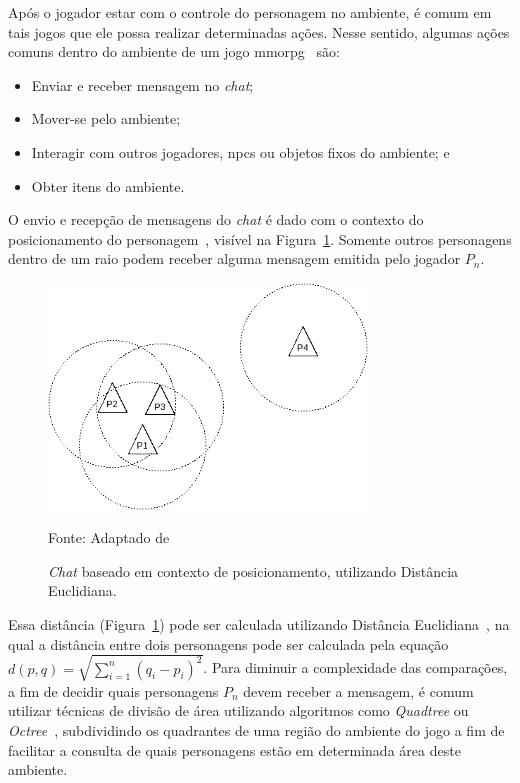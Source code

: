 Após o jogador estar com o controle do personagem no ambiente, é comum em tais jogos que ele possa realizar determinadas ações.
%
Nesse sentido, algumas ações comuns dentro do ambiente de um jogo \ac{mmorpg}~\cite{mmorpg_culture} são:

\begin{itemize}
  \item Enviar e receber mensagem no \textit{chat};
  \item Mover-se pelo ambiente;
  \item Interagir com outros jogadores, \acp{npc} ou objetos fixos do ambiente; e
  \item Obter itens do ambiente.
\end{itemize}



O envio e recepção de mensagens do \textit{chat} é dado com o contexto do posicionamento do personagem~\cite{albion_online_unite}, visível na Figura~\ref{fig:chat}.
%
Somente outros personagens dentro de um raio podem receber alguma mensagem emitida pelo jogador $P_n$.

\begin{figure}[htb!]
\caption{\textit{Chat} baseado em contexto de posicionamento, utilizando Distância Euclidiana.}
\label{fig:chat}
\includegraphics[height=6cm]{img/cap2/chat.png}
\centering

Fonte: Adaptado de ~\cite{albion_online_unite}
\end{figure}

Essa distância (Figura~\ref{fig:chat}) pode ser calculada utilizando Distância Euclidiana~\cite{Deza2009Aug}, na qual a distância entre dois personagens pode ser calculada pela equação $d(p, q) = \sqrt{\sum_{i=1}^{n}(q_i - p_i)^2}$.
%
Para diminuir a complexidade das comparações, a fim de decidir quais personagens $P_n$ devem receber a mensagem, é comum utilizar técnicas de divisão de área utilizando algoritmos como \textit{Quadtree} ou \textit{Octree}~\cite{Lengyel2011Jun}, subdividindo os quadrantes de uma região do ambiente do jogo a fim de facilitar a consulta de quais personagens estão em determinada área deste ambiente.


